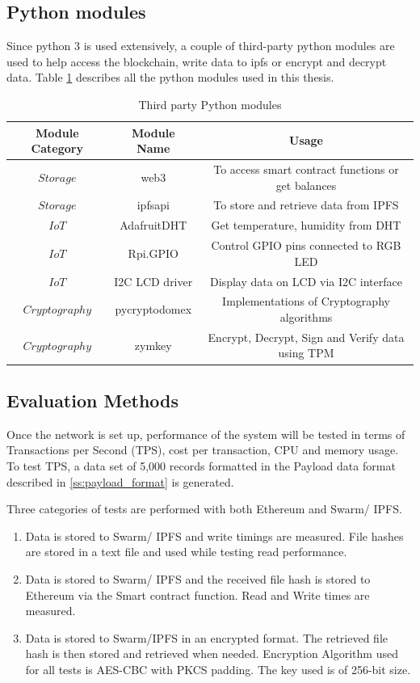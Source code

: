 \documentclass[11pt,openright]{report}
\begin{document}
\subsection{Python modules}
Since python 3 is used extensively, a couple of third-party python modules are used to help access the blockchain, write data to ipfs or encrypt and decrypt data. Table \ref{python_modules} describes all the python modules used in this thesis.

\begin{table}[!htbp]
    \renewcommand{\arraystretch}{1.3}
    \caption{Third party Python modules}
    \label{python_modules}
    \centering
    \begin{tabular}{|c|c|c|}
        \hline
        \bfseries Module Category & \bfseries Module Name & \bfseries Usage \\
        \hline\hline
        $Storage$ & web3 & To access smart contract functions or get balances \\ \hline
        $Storage$ & ipfsapi & To store and retrieve data from IPFS \\ \hline
        $IoT$ & AdafruitDHT & Get temperature, humidity from DHT \\ \hline
        $IoT$ & Rpi.GPIO & Control GPIO pins connected to RGB LED \\ \hline
        $IoT$ & I2C LCD driver & Display data on LCD via I2C interface \\ \hline
        $Cryptography$ & pycryptodomex & Implementations of Cryptography algorithms \\ \hline
        $Cryptography$ & zymkey & Encrypt, Decrypt, Sign and Verify data using TPM \\ \hline
    \end{tabular}
\end{table}

\subsection{Evaluation Methods}
Once the network is set up, performance of the system will be tested in terms of Transactions per Second (TPS), cost per transaction, CPU and memory usage. To test TPS, a data set of 5,000 records formatted in the Payload data format described in \ref{ss:payload_format} is generated.

Three categories of tests are performed with both Ethereum and Swarm/ IPFS.
\begin{enumerate}
    \item Data is stored to Swarm/ IPFS and write timings are measured. File hashes are stored in a text file and used while testing read performance.
    \item Data is stored to Swarm/ IPFS and the received file hash is stored to Ethereum via the Smart contract function. Read and Write times are measured.
    \item Data is stored to Swarm/IPFS in an encrypted format. The retrieved file hash is then stored and retrieved when needed. Encryption Algorithm used for all tests is AES-CBC with PKCS padding. The key used is of 256-bit size.
\end{enumerate}
\end{document}
